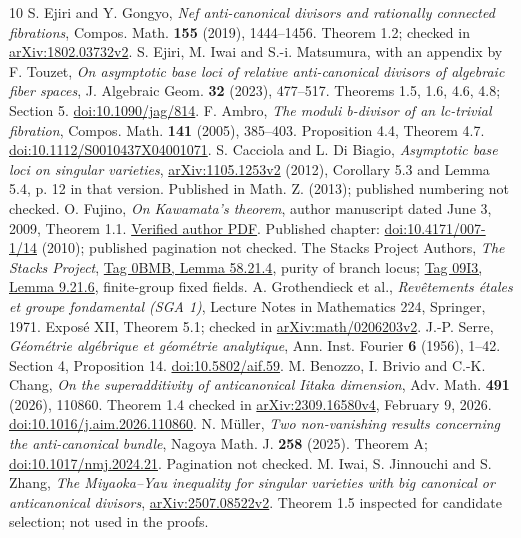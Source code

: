 \documentclass[12pt]{amsart}
\theoremstyle{definition}
\theoremstyle{remark}
\numberwithin{equation}{section}
\begin{document}
\begin{thebibliography}{10}
 S. Ejiri and Y. Gongyo, \emph{Nef anti-canonical divisors and rationally connected fibrations}, Compos. Math. \textbf{155} (2019), 1444--1456. Theorem 1.2; checked in \href{https://arxiv.org/abs/1802.03732v2}{arXiv:1802.03732v2}.
 S. Ejiri, M. Iwai and S.-i. Matsumura, with an appendix by F. Touzet, \emph{On asymptotic base loci of relative anti-canonical divisors of algebraic fiber spaces}, J. Algebraic Geom. \textbf{32} (2023), 477--517. Theorems 1.5, 1.6, 4.6, 4.8; Section 5. \href{https://doi.org/10.1090/jag/814}{doi:10.1090/jag/814}.
 F. Ambro, \emph{The moduli b-divisor of an lc-trivial fibration}, Compos. Math. \textbf{141} (2005), 385--403. Proposition 4.4, Theorem 4.7. \href{https://doi.org/10.1112/S0010437X04001071}{doi:10.1112/S0010437X04001071}.
 S. Cacciola and L. Di Biagio, \emph{Asymptotic base loci on singular varieties}, \href{https://arxiv.org/abs/1105.1253v2}{arXiv:1105.1253v2} (2012), Corollary 5.3 and Lemma 5.4, p. 12 in that version. Published in Math. Z. (2013); published numbering not checked.
 O. Fujino, \emph{On Kawamata's theorem}, author manuscript dated June 3, 2009, Theorem 1.1. \href{https://www.math.kyoto-u.ac.jp/~fujino/kawamata10.pdf}{Verified author PDF}. Published chapter: \href{https://doi.org/10.4171/007-1/14}{doi:10.4171/007-1/14} (2010); published pagination not checked.
 The Stacks Project Authors, \emph{The Stacks Project}, \href{https://stacks.math.columbia.edu/tag/0BMB}{Tag 0BMB, Lemma 58.21.4}, purity of branch locus; \href{https://stacks.math.columbia.edu/tag/09I3}{Tag 09I3, Lemma 9.21.6}, finite-group fixed fields.
 A. Grothendieck et al., \emph{Rev\^etements \'etales et groupe fondamental (SGA 1)}, Lecture Notes in Mathematics 224, Springer, 1971. Expos\'e XII, Theorem 5.1; checked in \href{https://arxiv.org/abs/math/0206203v2}{arXiv:math/0206203v2}.
 J.-P. Serre, \emph{G\'eom\'etrie alg\'ebrique et g\'eom\'etrie analytique}, Ann. Inst. Fourier \textbf{6} (1956), 1--42. Section 4, Proposition 14. \href{https://doi.org/10.5802/aif.59}{doi:10.5802/aif.59}.
 M. Benozzo, I. Brivio and C.-K. Chang, \emph{On the superadditivity of anticanonical Iitaka dimension}, Adv. Math. \textbf{491} (2026), 110860. Theorem 1.4 checked in \href{https://arxiv.org/abs/2309.16580v4}{arXiv:2309.16580v4}, February 9, 2026. \href{https://doi.org/10.1016/j.aim.2026.110860}{doi:10.1016/j.aim.2026.110860}.
 N. M\"uller, \emph{Two non-vanishing results concerning the anti-canonical bundle}, Nagoya Math. J. \textbf{258} (2025). Theorem A; \href{https://doi.org/10.1017/nmj.2024.21}{doi:10.1017/nmj.2024.21}. Pagination not checked.
 M. Iwai, S. Jinnouchi and S. Zhang, \emph{The Miyaoka--Yau inequality for singular varieties with big canonical or anticanonical divisors}, \href{https://arxiv.org/html/2507.08522v2}{arXiv:2507.08522v2}. Theorem 1.5 inspected for candidate selection; not used in the proofs.
\end{thebibliography}
\end{document}
